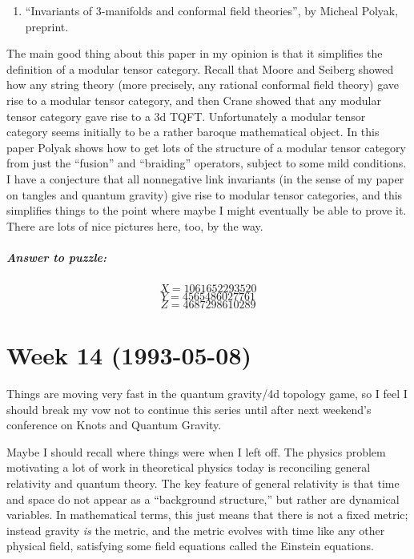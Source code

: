 \documentclass{article}
\def\tightlist{}
\begin{document}
\begin{enumerate}
\def\labelenumi{\arabic{enumi})}
\setcounter{enumi}{5}
\tightlist
\item
  ``Invariants of 3-manifolds and conformal field theories'', by Micheal
  Polyak, preprint.
\end{enumerate}

The main good thing about this paper in my opinion is that it simplifies
the definition of a modular tensor category. Recall that Moore and
Seiberg showed how any string theory (more precisely, any rational
conformal field theory) gave rise to a modular tensor category, and then
Crane showed that any modular tensor category gave rise to a 3d TQFT.
Unfortunately a modular tensor category seems initially to be a rather
baroque mathematical object. In this paper Polyak shows how to get lots
of the structure of a modular tensor category from just the ``fusion''
and ``braiding'' operators, subject to some mild conditions. I have a
conjecture that all nonnegative link invariants (in the sense of my
paper on tangles and quantum gravity) give rise to modular tensor
categories, and this simplifies things to the point where maybe I might
eventually be able to prove it. There are lots of nice pictures here,
too, by the way.

\hypertarget{answer-to-puzzle}{%
\subparagraph{Answer to puzzle:}\label{answer-to-puzzle}}

\[X = 1061652293520\] \[Y = 4565486027761\] \[Z = 4687298610289\]
\hypertarget{week14}{%
\section{Week 14 (1993-05-08)}\label{week14}}

Things are moving very fast in the quantum gravity/4d topology game, so
I feel I should break my vow not to continue this series until after
next weekend's conference on Knots and Quantum Gravity.

Maybe I should recall where things were when I left off. The physics
problem motivating a lot of work in theoretical physics today is
reconciling general relativity and quantum theory. The key feature of
general relativity is that time and space do not appear as a
``background structure,'' but rather are dynamical variables. In
mathematical terms, this just means that there is not a fixed metric;
instead gravity \emph{is} the metric, and the metric evolves with time
like any other physical field, satisfying some field equations called
the Einstein equations.
\end{document}
